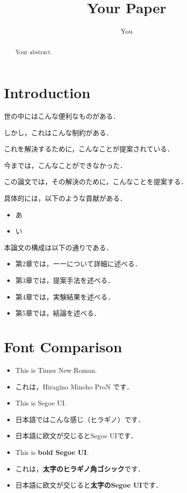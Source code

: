 \documentclass[twocolumn]{ltjsarticle}
\title{Your Paper}
\author{You}
\begin{document}
\maketitle

\begin{abstract}
	Your abstract.
\end{abstract}

\section{Introduction}

	世の中にはこんな便利なものがある．

	しかし，これはこんな制約がある．

	これを解決するために，こんなことが提案されている．

	今までは，こんなことができなかった．

	この論文では，その解決のために，こんなことを提案する．

	具体的には，以下のような貢献がある．
	\begin{itemize}
		\item あ
		\item い
	\end{itemize}

	本論文の構成は以下の通りである．
	\begin{itemize}
		\item 第2章では，ーーについて詳細に述べる．
		\item 第3章では，提案手法を述べる．
		\item 第4章では，実験結果を述べる．
		\item 第5章では，結論を述べる．
	\end{itemize}

\section{Font Comparison}

	\begin{itemize}
		\item This is Times New Roman.
		\item これは，Hiragino Mincho ProN です．
		\item This is \textsf{Segoe UI}.
		\item 日本語では\textsf{こんな感じ（ヒラギノ）}です．
		\item 日本語に欧文が交じると\textsf{Segoe UI}です．
		\item This is \textbf{bold Segoe UI}.
		\item これは，\textbf{太字のヒラギノ角ゴシック}です．
		\item 日本語に欧文が交じると\textbf{太字のSegoe UI}です．
	\end{itemize}
\end{document}
